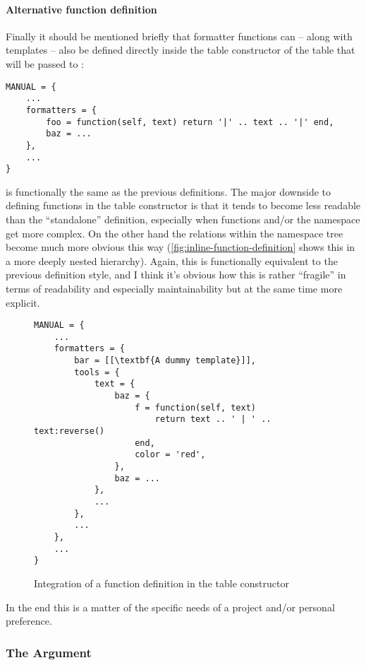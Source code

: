 \documentclass[12pt]{scrartcl}
\begin{document}
\paragraph{Alternative function definition}

Finally it should be mentioned briefly that formatter functions can -- along with templates -- also be defined directly inside the table constructor of the table that will be passed to :


\begin{verbatim}
MANUAL = {
    ...
    formatters = {
        foo = function(self, text) return '|' .. text .. '|' end,
        baz = ...
    },
	...
}
\end{verbatim}

\noindent is functionally the same as the previous definitions.  The major
downside to defining functions in the table constructor is that it tends to
become less readable than the “standalone” definition, especially when functions
and/or the namespace get more complex.  On the other hand the relations within
the namespace tree become much more obvious this way
(\vref{fig:inline-function-definition} shows this in a more deeply nested
hierarchy). Again, this is functionally equivalent to the previous definition
style, and I think it's obvious how this is rather “fragile” in terms of
readability and especially maintainability but at the same time more explicit.

\begin{figure}
\begin{verbatim}
MANUAL = {
    ...
    formatters = {
		bar = [[\textbf{A dummy template}]],
        tools = {
            text = {
                baz = {
                    f = function(self, text)
                        return text .. ' | ' .. text:reverse()
                    end,
                    color = 'red',
                },
                baz = ...
            },
            ...
        },
        ...
    },
    ...
}
\end{verbatim}
\caption{Integration of a function definition in the table constructor}
\label{fig:inline-function-definition}
\end{figure}

In the end this is a matter of the specific needs of a project and/or personal
preference.


\subsubsection{The  Argument}
\label{sec:defining:the-self-argument}
\end{document}
